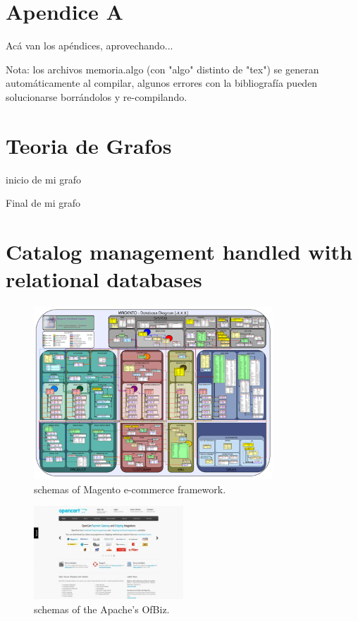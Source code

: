 
\appendix
\newpage
\chapter{Apendice A}
\label{Apendice A}
Acá van los apéndices, aprovechando...

Nota: los archivos memoria.algo (con "algo" distinto de "tex") se generan automáticamente al compilar, algunos errores con la bibliografía pueden solucionarse borrándolos y re-compilando.

\chapter{Teoria de Grafos}\label{ap:apendice_B}
inicio de mi grafo \cite{book_introduction_graph_theory}

Final de mi grafo

\chapter{Catalog management handled with relational databases}\label{ap:apendice_C}

\begin{figure}[h!]
	\centering
	\includegraphics[width=0.8\textwidth]{figuras/apendice/magento_sample_database_diagram.png}
	\caption{schemas of Magento e-commerce framework.}
	\label{ap:figure:catalog_magento}
\end{figure}

\begin{figure}[h!]
	\centering
	\includegraphics[width=0.5\textwidth]{figuras/apendice/openCartWebsite.jpg}
	\caption{schemas of the Apache's OfBiz.}
	\label{ap:figure:catalog_ofbiz}
\end{figure}